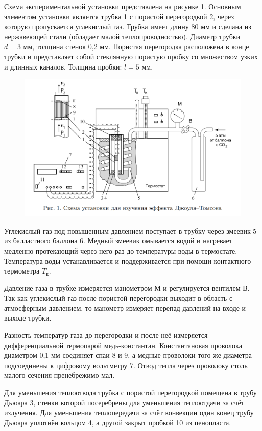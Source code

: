 \documentclass[15pt,a5paper,reqno]{article}
\begin{document}
    Схема экспериментальной установки представлена на рисунке 1. Основным элементом установки является трубка 1 с пористой перегородкой 2, через которую пропускается углекислый газ. Трубка имеет длину 80 мм и сделана из нержавеющей стали (обладает малой теплопроводностью). Диаметр трубки $d = 3\text{ мм}$, толщина стенок 0,2 мм. Пористая перегородка расположена в конце трубки и представляет собой стеклянную пористую пробку со множеством узких и длинных каналов. Толщина пробки: $l = 5\text{ мм}$.
    \begin{figure}[h]
        \includegraphics[width = \textwidth]{Рисунок 1.png}
    \end{figure}
    
    Углекислый газ под повышенным давлением поступает в трубку через змеевик 5 из балластного баллона 6. Медный змеевик омывается водой и нагревает медленно протекающий через него раз до температуры воды в термостате. Температура воды устанавливается и поддерживается при помощи контактного термометра $T_{\text{к}}$.
    
    Давление газа в трубке измеряется манометром М и регулируется вентилем В. Так как углекислый газ после пористой перегородки выходит в область с атмосферным давлением, то манометр измеряет перепад давлений на входе и выходе трубки.
    
    Разность температур газа до перегородки и после неё измеряется дифференциальной термопарой медь-константан. Константановая проволока диаметром 0,1 мм соединяет спаи 8 и 9, а медные проволоки того же диаметра подсоединены к цифровому вольтметру 7. Отвод тепла через проволоку столь малого сечения пренебрежимо мал. 
    
    Для уменьшения теплоотвода трубка с пористой перегородкой помещена в трубу Дьюара 3, стенки которой посеребрены для уменьшения теплоотдачи за счёт излучения. Для уменьшения теплопередачи за счёт конвекции один конец трубу Дьюара уплотнён кольцом 4, а другой закрыт пробкой 10 из пенопласта. 
\end{document}
